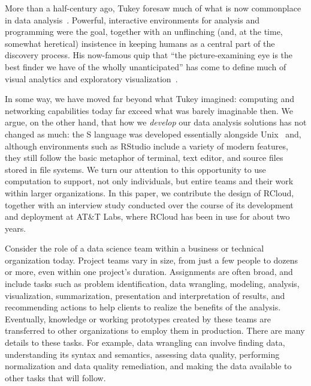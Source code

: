 
\maketitle

More than a half-century ago, Tukey foresaw
much of what is now commonplace in data analysis~\cite{TukeyFDA}.
Powerful, interactive environments for analysis and programming were
the goal, together with an unflinching (and, at the time, somewhat
heretical) insistence in keeping humans as a central part of the
discovery process. His now-famous quip that ``the picture-examining eye is the
best finder we have of the wholly unanticipated'' has come to define
much of visual analytics and exploratory visualization~\cite{TukeyEDA}.

In some way, we have moved far beyond what Tukey imagined:
computing and networking capabilities today far exceed
what was barely imaginable then. 
We argue, on the other hand, that how we \emph{develop} our data analysis
solutions has not changed as much: the S language
was developed essentially alongside Unix~\cite{TheSSystem} and,
although environments such as RStudio include a variety of modern
features, they still follow the basic metaphor of terminal, text
editor, and source files stored in file systems.
We turn our attention to this opportunity to use computation
to support, not only individuals, but entire teams and their
work within larger organizations. In this paper, we contribute the
design of RCloud, together with an interview study conducted over the
course of its development and deployment at AT\&T Labs, where RCloud has
been in use for about two years.

Consider the role of a data science team within
a business or technical organization today.
Project teams vary in size, from just a few people to dozens or
more, even within one project's duration. Assignments are often
broad, and include tasks such as problem identification,
data wrangling, modeling, analysis, visualization, summarization,
presentation and interpretation of results, and recommending
actions to help clients to realize the benefits of the analysis.
Eventually, knowledge or working prototypes created by these teams
are transferred to other organizations to employ them in production.
There are many details to these tasks. For example, data wrangling can involve
finding data, understanding its syntax and semantics, assessing data quality,
performing normalization and data quality remediation, and making the data
available to other tasks that will follow.

